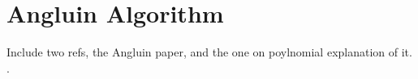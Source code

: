 \section{Angluin Algorithm}

Include two refs, the Angluin paper, and the one on poylnomial explanation of
it. \cite{angluin_learning_1992, arias_canonical_2009}.